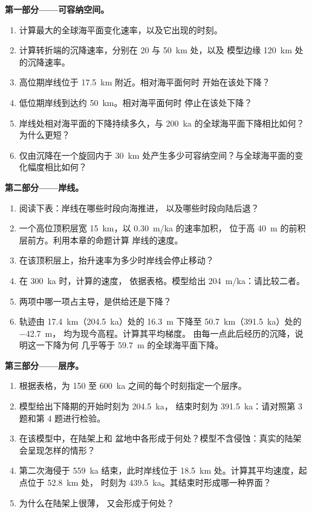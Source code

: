 \begin{problem}
\medskip\noindent\textbf{第一部分——可容纳空间。}
\begin{enumerate}
\item 计算最大的全球海平面变化速率，以及它出现的时刻。
\item 计算转折端的沉降速率，分别在 20 与 \qty{50}{km} 处，以及
  模型边缘 \qty{120}{km} 处的沉降速率。
\item 高位期岸线位于 \qty{17.5}{km} 附近。相对海平面何时
  开始在该处下降？
\item 低位期岸线到达约 \qty{50}{km}。相对海平面何时
  停止在该处下降？
\item 岸线处相对海平面的下降持续多久，与
  \qty{200}{ka} 的全球海平面下降相比如何？为什么更短？
\item 仅由沉降在一个旋回内于
  \qty{30}{km} 处产生多少可容纳空间？与全球海平面的变化幅度相比如何？
\end{enumerate}

\medskip\noindent\textbf{第二部分——岸线。}
\begin{enumerate}[resume]
\item 阅读下表：岸线在哪些时段向海推进，
  以及哪些时段向陆后退？
\item 一个高位顶积层宽 \qty{15}{km}，以 \qty{0.30}{m/ka} 的速率加积，
  位于高 \qty{40}{m} 的前积层前方。利用本章的命题计算
  岸线的速度。
\item 在该顶积层上，抬升速率为多少时岸线会停止移动？
\item 在 \qty{300}{ka} 时，计算的速度，
  依据表格。模型给出 \qty{204}{m/ka}：请比较二者。
\item 两项中哪一项占主导，是供给还是下降？
\item 轨迹由 \qty{17.4}{km}（\qty{204.5}{ka}）处的 \qty{16.3}{m}
  下降至 \qty{50.7}{km}（\qty{391.5}{ka}）处的 \qty{-42.7}{m}，
  均为现今高程。计算其平均梯度。
  由每一点此后经历的沉降，说明这一下降为何
  几乎等于 \qty{59.7}{m} 的全球海平面下降。
\end{enumerate}

\medskip\noindent\textbf{第三部分——层序。}
\begin{enumerate}[resume]
\item 根据表格，为 150 至
  \qty{600}{ka} 之间的每个时刻指定一个层序。
\item 模型给出下降期的开始时刻为 \qty{204.5}{ka}，
  结束时刻为 \qty{391.5}{ka}：请对照第 3 题和第 4 题进行检验。
\item 在该模型中，在陆架上和
  盆地中各形成于何处？模型不含侵蚀：真实的陆架会呈现怎样的情形？
\item 第二次海侵于 \qty{559}{ka} 结束，此时岸线位于
  \qty{18.5}{km} 处。计算其平均速度，起点位于 \qty{52.8}{km} 处，
  时刻为 \qty{439.5}{ka}。其结束时形成哪一种界面？
\item 为什么在陆架上很薄，
  又会形成于何处？
\end{enumerate}


\end{problem}

